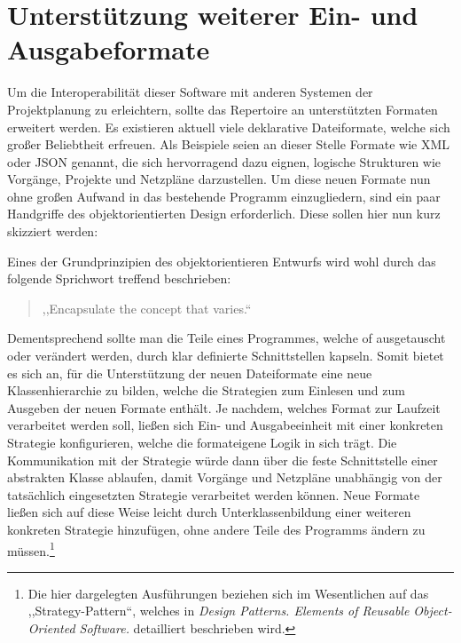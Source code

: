 \section{Unterst\"utzung weiterer Ein- und Ausgabeformate}

Um die Interoperabilit\"at dieser Software mit anderen Systemen der
Projektplanung zu erleichtern, sollte das Repertoire an
unterst\"utzten Formaten erweitert werden. Es existieren aktuell viele
deklarative Dateiformate, welche sich gro{\ss}er Beliebtheit
erfreuen. Als Beispiele seien an dieser Stelle Formate wie XML oder
JSON genannt, die sich hervorragend dazu eignen, logische Strukturen
wie Vorg\"ange, Projekte und Netzpl\"ane darzustellen. Um diese neuen
Formate nun ohne gro{\ss}en Aufwand in das bestehende Programm
einzugliedern, sind ein paar Handgriffe des objektorientierten Design
erforderlich. Diese sollen hier nun kurz skizziert werden:

Eines der Grundprinzipien des objektorientieren Entwurfs wird wohl
durch das folgende Sprichwort treffend beschrieben:
\begin{quotation}
,,Encapsulate the concept that varies.``
\end{quotation}
Dementsprechend sollte man die Teile eines Programmes, welche of
ausgetauscht oder ver\"andert werden, durch klar definierte
Schnittstellen kapseln. Somit bietet es sich an, f\"ur die
Unterst\"utzung der neuen Dateiformate eine neue Klassenhierarchie zu
bilden, welche die Strategien zum Einlesen und zum Ausgeben der neuen
Formate enth\"alt. Je nachdem, welches Format zur Laufzeit
verarbeitet werden soll, lie{\ss}en sich Ein- und Ausgabeeinheit mit
einer konkreten Strategie konfigurieren, welche die formateigene Logik
in sich tr\"agt. Die Kommunikation mit der Strategie w\"urde dann
\"uber die feste Schnittstelle einer abstrakten Klasse ablaufen, damit
Vorg\"ange und Netzpl\"ane unabh\"angig von der tats\"achlich
eingesetzten Strategie
verarbeitet werden k\"onnen. Neue Formate lie{\ss}en sich auf diese
Weise leicht durch Unterklassenbildung einer weiteren konkreten
Strategie hinzuf\"ugen, ohne andere Teile des Programms \"andern zu
m\"ussen.\footnote{Die hier dargelegten Ausf\"uhrungen beziehen sich
  im Wesentlichen auf das ,,Strategy-Pattern``, welches in
  \textit{Design Patterns. Elements of Reusable Object-Oriented
    Software.} detailliert beschrieben wird.}

